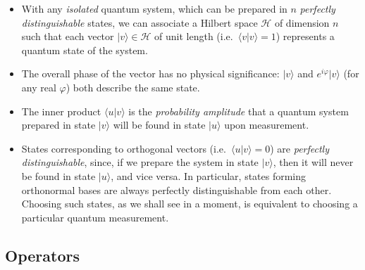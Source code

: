\documentclass[fleqn]{article}
\newenvironment{idea}{\noindent}{\medskip}
\begin{document}
\begin{idea}

\begin{itemize}
\item
  With any \emph{isolated} quantum system, which can be prepared in \(n\) \emph{perfectly distinguishable} states, we can associate a Hilbert space \(\mathcal{H}\) of dimension \(n\) such that each vector \(|v\rangle\in\mathcal{H}\) of unit length (i.e.~\(\langle v|v\rangle =1\)) represents a quantum state of the system.
\item
  The overall phase of the vector has no physical significance: \(|v\rangle\) and \(e^{i\varphi}|v\rangle\) (for any real \(\varphi\)) both describe the same state.
\item
  The inner product \(\langle u|v\rangle\) is the \emph{probability amplitude} that a quantum system prepared in state \(|v\rangle\) will be found in state \(|u\rangle\) upon measurement.
\item
  States corresponding to orthogonal vectors (i.e.~\(\langle u|v\rangle=0\)) are \emph{perfectly distinguishable}, since, if we prepare the system in state \(|v\rangle\), then it will never be found in state \(|u\rangle\), and vice versa.
  In particular, states forming orthonormal bases are always perfectly distinguishable from each other.
  Choosing such states, as we shall see in a moment, is equivalent to choosing a particular quantum measurement.
\end{itemize}


\end{idea}

\hypertarget{operators}{%
\subsection{Operators}\label{operators}}
\end{document}
